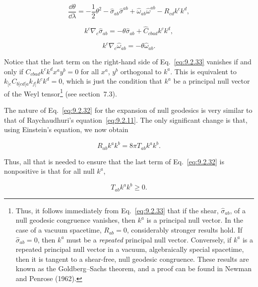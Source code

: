 \begin{equation}
  \frac{\dd\theta}{\dd\lambda}
  =-\frac12\theta^2-\widehat\sigma_{ab}\widehat\sigma^{ab}
   +\widehat\omega_{ab}\widehat\omega^{ab}-R_{cd}k^ck^d ,
  \tag{9.2.32}\label{eq:9.2.32}
\end{equation}

\begin{equation}
  k^c\nabla_c\widehat\sigma_{ab}
  =-\theta\widehat\sigma_{ab}+\widehat C_{cbad}k^ck^d ,
  \tag{9.2.33}\label{eq:9.2.33}
\end{equation}

\begin{equation}
  k^c\nabla_c\widehat\omega_{ab}
  =-\theta\widehat\omega_{ab} .
  \tag{9.2.34}\label{eq:9.2.34}
\end{equation}

Notice that the last term on the right-hand side of Eq.~\eqref{eq:9.2.33} vanishes if
and only if \(C_{cbad}k^ck^dx^ay^b=0\) for all \(x^a\), \(y^b\) orthogonal to \(k^a\).
This is equivalent to \(k_{[e}C_{b]cd[a}k_{f]}k^ck^d=0\), which is just the condition
that \(k^a\) be a principal null vector of the Weyl tensor\footnote{Thus, it follows immediately from
Eq.~\eqref{eq:9.2.33} that if the shear, \(\widehat\sigma_{ab}\), of a null geodesic congruence
vanishes, then \(k^a\) is a principal null vector. In the case of a vacuum spacetime,
\(R_{ab}=0\), considerably stronger results hold. If \(\widehat\sigma_{ab}=0\), then
\(k^a\) must be a \emph{repeated} principal null vector. Conversely, if \(k^a\) is a repeated
principal null vector in a vacuum, algebraically special spacetime, then it is tangent to
a shear-free, null geodesic congruence. These results are known as the Goldberg--Sachs
theorem, and a proof can be found in Newman and Penrose (1962).}
(see section~7.3).

The nature of Eq.~\eqref{eq:9.2.32} for the expansion of null geodesics is very similar
to that of Raychaudhuri's equation~\eqref{eq:9.2.11}. The only significant change is
that, using Einstein's equation, we now obtain

\begin{equation}
  R_{ab}k^ak^b=8\pi T_{ab}k^ak^b .
  \tag{9.2.35}\label{eq:9.2.35}
\end{equation}

Thus, all that is needed to ensure that the last term of Eq.~\eqref{eq:9.2.32} is
nonpositive is that for all null \(k^a\),

\begin{equation}
  T_{ab}k^ak^b\geq0 .
  \tag{9.2.36}\label{eq:9.2.36}
\end{equation}

